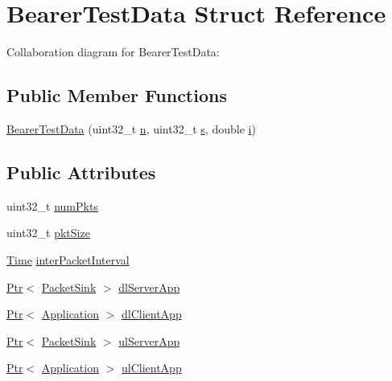 \hypertarget{structBearerTestData}{}\section{Bearer\+Test\+Data Struct Reference}
\label{structBearerTestData}


Collaboration diagram for Bearer\+Test\+Data\+:
\subsection*{Public Member Functions}
\begin{DoxyCompactItemize}
\item 
\hyperlink{structBearerTestData_a35639e55d4af0a7bf371fc095a36b839}{Bearer\+Test\+Data} (uint32\+\_\+t \hyperlink{lte__link__budget__x2__handover__measures_8m_abdb05bc5a064cf642a06c83b3392f148}{n}, uint32\+\_\+t \hyperlink{generate__test__data__lte__sinr_8m_ad83eeb3a142285d1243a08c6b7026df8}{s}, double \hyperlink{lte__uplink__power__control_8m_a6f6ccfcf58b31cb6412107d9d5281426}{i})
\end{DoxyCompactItemize}
\subsection*{Public Attributes}
\begin{DoxyCompactItemize}
\item 
uint32\+\_\+t \hyperlink{structBearerTestData_a2445558cf316cb91e159d8dbf098b700}{num\+Pkts}
\item 
uint32\+\_\+t \hyperlink{structBearerTestData_a247a1b66bdff7fb5079ddec1b07ff425}{pkt\+Size}
\item 
\hyperlink{classns3_1_1Time}{Time} \hyperlink{structBearerTestData_a16179db57cfd8ca5e837da1384d5c03d}{inter\+Packet\+Interval}
\item 
\hyperlink{classns3_1_1Ptr}{Ptr}$<$ \hyperlink{classns3_1_1PacketSink}{Packet\+Sink} $>$ \hyperlink{structBearerTestData_a6a731d0528d513813da7c22c1d1e38c6}{dl\+Server\+App}
\item 
\hyperlink{classns3_1_1Ptr}{Ptr}$<$ \hyperlink{classns3_1_1Application}{Application} $>$ \hyperlink{structBearerTestData_af7a00cca0b35d25c41d1e094b89951ca}{dl\+Client\+App}
\item 
\hyperlink{classns3_1_1Ptr}{Ptr}$<$ \hyperlink{classns3_1_1PacketSink}{Packet\+Sink} $>$ \hyperlink{structBearerTestData_a8fce1512a7cf16729114a69bab92d99e}{ul\+Server\+App}
\item 
\hyperlink{classns3_1_1Ptr}{Ptr}$<$ \hyperlink{classns3_1_1Application}{Application} $>$ \hyperlink{structBearerTestData_a8c662bad70dd6e2ba12834710db885d8}{ul\+Client\+App}
\end{DoxyCompactItemize}


